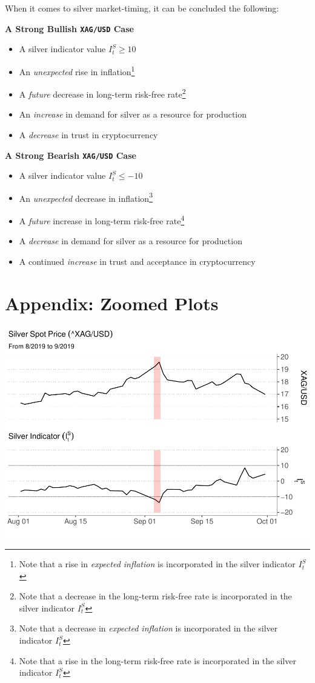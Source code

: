 \documentclass[
  12pt,
]{article}
\providecommand{\tightlist}{%
  \setlength{\itemsep}{0pt}\setlength{\parskip}{0pt}}
\begin{document}
When it comes to silver market-timing, it can be concluded the
following:

\textbf{A Strong Bullish \texttt{XAG/USD} Case}

\begin{itemize}
\tightlist
\item
  A silver indicator value \(I^S_t \geq 10\)
\item
  An \emph{unexpected} rise in inflation\footnote{Note that a rise in
    \emph{expected inflation} is incorporated in the silver indicator
    \(I^S_t\)}
\item
  A \emph{future} decrease in long-term risk-free rate\footnote{Note
    that a decrease in the long-term risk-free rate is incorporated in
    the silver indicator \(I^S_t\)}
\item
  An \emph{increase} in demand for silver as a resource for production
\item
  A \emph{decrease} in trust in cryptocurrency
\end{itemize}

\textbf{A Strong Bearish \texttt{XAG/USD} Case}

\begin{itemize}
\tightlist
\item
  A silver indicator value \(I^S_t \leq -10\)
\item
  An \emph{unexpected} decrease in inflation\footnote{Note that a
    decrease in \emph{expected inflation} is incorporated in the silver
    indicator \(I^S_t\)}
\item
  A \emph{future} increase in long-term risk-free rate\footnote{Note
    that a rise in the long-term risk-free rate is incorporated in the
    silver indicator \(I^S_t\)}
\item
  A \emph{decrease} in demand for silver as a resource for production
\item
  A continued \emph{increase} in trust and acceptance in cryptocurrency
\end{itemize}

\hypertarget{appendix-zoomed-plots}{%
\section{Appendix: Zoomed Plots}\label{appendix-zoomed-plots}}

\includegraphics{silver-market-timing_files/figure-latex/highlighted-plot2-1.pdf}
\end{document}
